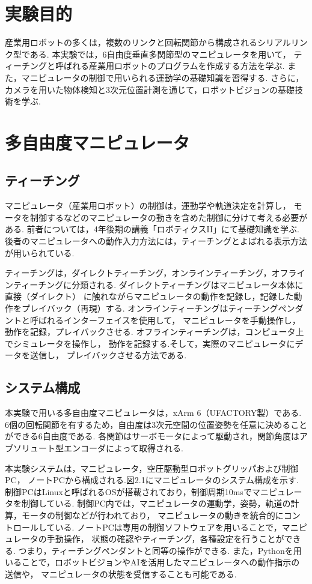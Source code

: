 
\section{実験目的}

産業用ロボットの多くは，複数のリンクと回転関節から構成されるシリアルリンク型である.
本実験では，6自由度垂直多関節型のマニピュレータを用いて，
ティーチングと呼ばれる産業用ロボットのプログラムを作成する方法を学ぶ.
また，マニピュレータの制御で用いられる運動学の基礎知識を習得する.
さらに，カメラを用いた物体検知と3次元位置計測を通じて，ロボットビジョンの基礎技術を学ぶ.


\section{多自由度マニピュレータ}

\subsection{ティーチング}
マニピュレータ（産業用ロボット）の制御は，運動学や軌道決定を計算し，
モータを制御するなどのマニピュレータの動きを含めた制御に分けて考える必要がある.
前者については，4年後期の講義「ロボティクスII」にて基礎知識を学ぶ.
後者のマニピュレータへの動作入力方法には，ティーチングとよばれる表示方法が用いられている.

ティーチングは，ダイレクトティーチング，オンラインティーチング，オフラインティーチングに分類される.
ダイレクトティーチングはマニピュレータ本体に直接（ダイレクト）
に触れながらマニピュレータの動作を記録し，記録した動作をプレイバック（再現）する.
オンラインティーチングはティーチングペンダントと呼ばれるインターフェイスを使用して，
マニピュレータを手動操作し，動作を記録，プレイバックさせる.
オフラインティーチングは，コンピュータ上でシミュレータを操作し，
動作を記録する.そして，実際のマニピュレータにデータを送信し，
プレイバックさせる方法である.

\subsection{システム構成}
本実験で用いる多自由度マニピュレータは，xArm 6（UFACTORY製）である.
6個の回転関節を有するため，自由度は3次元空間の位置姿勢を任意に決めることができる6自由度である.
各関節はサーボモータによって駆動され，関節角度はアブソリュート型エンコーダによって取得される.

本実験システムは，マニピュレータ，空圧駆動型ロボットグリッパおよび制御PC，
ノートPCから構成される.図2.1にマニピュレータのシステム構成を示す.
制御PCはLinuxと呼ばれるOSが搭載されており，制御周期10msでマニピュレータを制御している.
制御PC内では，マニピュレータの運動学，姿勢，軌道の計算，モータの制御などが行われており，
マニピュレータの動きを統合的にコントロールしている.
ノートPCは専用の制御ソフトウェアを用いることで，マニピュレータの手動操作，
状態の確認やティーチング，各種設定を行うことができる.
つまり，ティーチングペンダントと同等の操作ができる.
また，Pythonを用いることで，ロボットビジョンやAIを活用したマニピュレータへの動作指示の送信や，
マニピュレータの状態を受信することも可能である.

